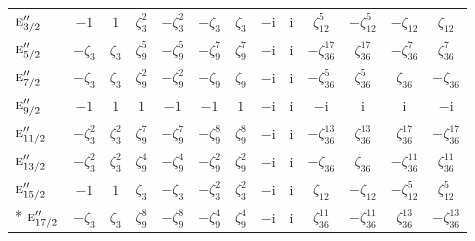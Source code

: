 \documentclass[10pt,a4paper]{article}
\numberwithin{equation}{section}
\newcommand{\irr}[1]{\text{\normalfont\scshape #1}}
\newcommand{\iunit}{\mathrm{i}}
\newcommand{\rootunity}[1]{\zeta_{#1}}
\begin{document}
{\begin{longtable}{@{}lcccccccccccc@{}}
$\irr{e}_{3/2}''$ & $-1$ & $1$ & $\rootunity{3}^{2}$ & $-\rootunity{3}^{2}$ & $-\rootunity{3}$ & $\rootunity{3}$ & $-\iunit{}$ & $\iunit{}$ & $\rootunity{12}^{5}$ & $-\rootunity{12}^{5}$ & $-\rootunity{12}$ & $\rootunity{12}$\\
$\irr{e}_{5/2}''$ & $-\rootunity{3}$ & $\rootunity{3}$ & $\rootunity{9}^{5}$ & $-\rootunity{9}^{5}$ & $-\rootunity{9}^{7}$ & $\rootunity{9}^{7}$ & $-\iunit{}$ & $\iunit{}$ & $-\rootunity{36}^{17}$ & $\rootunity{36}^{17}$ & $-\rootunity{36}^{7}$ & $\rootunity{36}^{7}$\\
$\irr{e}_{7/2}''$ & $-\rootunity{3}$ & $\rootunity{3}$ & $\rootunity{9}^{2}$ & $-\rootunity{9}^{2}$ & $-\rootunity{9}$ & $\rootunity{9}$ & $-\iunit{}$ & $\iunit{}$ & $-\rootunity{36}^{5}$ & $\rootunity{36}^{5}$ & $\rootunity{36}$ & $-\rootunity{36}$\\
$\irr{e}_{9/2}''$ & $-1$ & $1$ & $1$ & $-1$ & $-1$ & $1$ & $-\iunit{}$ & $\iunit{}$ & $-\iunit{}$ & $\iunit{}$ & $\iunit{}$ & $-\iunit{}$\\
$\irr{e}_{11/2}''$ & $-\rootunity{3}^{2}$ & $\rootunity{3}^{2}$ & $\rootunity{9}^{7}$ & $-\rootunity{9}^{7}$ & $-\rootunity{9}^{8}$ & $\rootunity{9}^{8}$ & $-\iunit{}$ & $\iunit{}$ & $-\rootunity{36}^{13}$ & $\rootunity{36}^{13}$ & $\rootunity{36}^{17}$ & $-\rootunity{36}^{17}$\\
$\irr{e}_{13/2}''$ & $-\rootunity{3}^{2}$ & $\rootunity{3}^{2}$ & $\rootunity{9}^{4}$ & $-\rootunity{9}^{4}$ & $-\rootunity{9}^{2}$ & $\rootunity{9}^{2}$ & $-\iunit{}$ & $\iunit{}$ & $-\rootunity{36}$ & $\rootunity{36}$ & $-\rootunity{36}^{11}$ & $\rootunity{36}^{11}$\\
$\irr{e}_{15/2}''$ & $-1$ & $1$ & $\rootunity{3}$ & $-\rootunity{3}$ & $-\rootunity{3}^{2}$ & $\rootunity{3}^{2}$ & $-\iunit{}$ & $\iunit{}$ & $\rootunity{12}$ & $-\rootunity{12}$ & $-\rootunity{12}^{5}$ & $\rootunity{12}^{5}$\\*
$\irr{e}_{17/2}''$ & $-\rootunity{3}$ & $\rootunity{3}$ & $\rootunity{9}^{8}$ & $-\rootunity{9}^{8}$ & $-\rootunity{9}^{4}$ & $\rootunity{9}^{4}$ & $-\iunit{}$ & $\iunit{}$ & $\rootunity{36}^{11}$ & $-\rootunity{36}^{11}$ & $\rootunity{36}^{13}$ & $-\rootunity{36}^{13}$\\
\bottomrule\end{longtable}}
\end{document}
